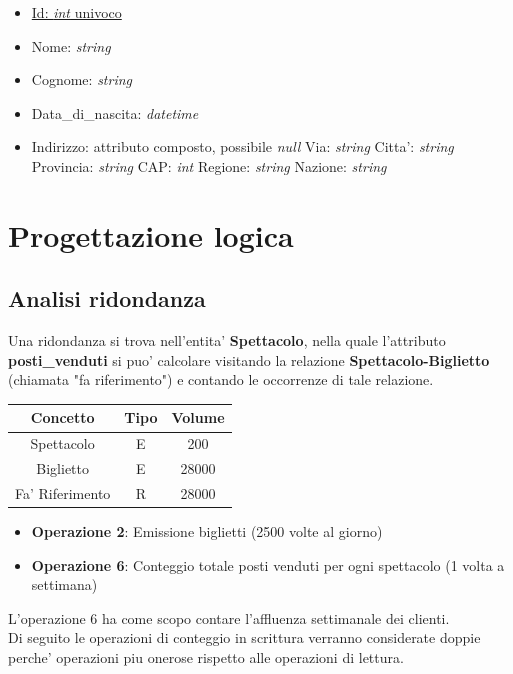 \documentclass[10pt]{article}
\begin{document}
\begin{itemize}
		\begin{itemize}
			\item \underline{Id: \textit{int} univoco}
			\item Nome: \textit{string}
			\item Cognome: \textit{string}
			\item Data\_di\_nascita: \textit{datetime}			
			\item Indirizzo: attributo composto, possibile \textit{null}
				\subitem Via: \textit{string}
				\subitem Citta': \textit{string}
				\subitem Provincia: \textit{string}
				\subitem CAP: \textit{int}
				\subitem Regione: \textit{string}
				\subitem Nazione: \textit{string}
		\end{itemize}
	\end{itemize}
	\section{Progettazione logica}
	\subsection{Analisi ridondanza}	
	Una ridondanza si trova nell'entita' \textbf{Spettacolo}, nella quale l'attributo \textbf{posti\_venduti} si puo' calcolare visitando la relazione \textbf{Spettacolo-Biglietto} (chiamata "fa riferimento") e contando le occorrenze di tale relazione.
	\begin{table}[!h]
		\centering
		\begin{tabular}{|c|c|c|}
			\hline
			\textbf{Concetto} & \textbf{Tipo} & \textbf{Volume} \\
			\hline
			Spettacolo & E & 200 \\
			\hline
			Biglietto & E & 28000 \\
			\hline
			Fa' Riferimento & R & 28000 \\
			\hline
		\end{tabular}
	\end{table}
	\begin{itemize}
		\item \textbf{Operazione 2}: Emissione biglietti (2500 volte al giorno)
		\item \textbf{Operazione 6}: Conteggio totale posti venduti per ogni spettacolo (1 volta a settimana)		
	\end{itemize}
	L'operazione 6 ha come scopo contare l'affluenza settimanale dei clienti.\\
	Di seguito le operazioni di conteggio in scrittura verranno considerate doppie perche' operazioni piu onerose rispetto alle operazioni di lettura.
\end{document}
